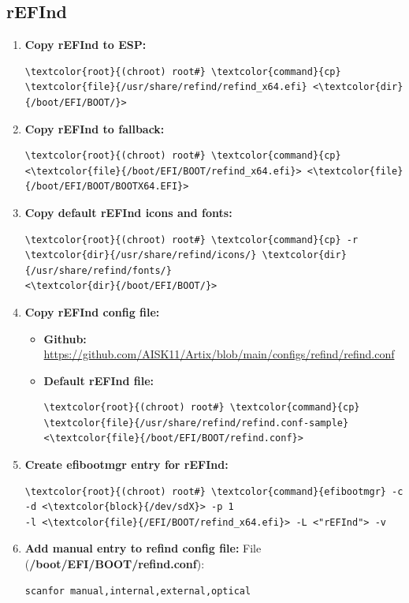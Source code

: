 \documentclass[10pt, a4paper, onecolumn, oneside, titlepage, openany]{book}
\begin{document}
\subsection{rEFInd}
\begin{enumerate}
    \item \textbf{Copy rEFInd to ESP:}
\begin{Verbatim}[commandchars=\\\{\}]
\textcolor{root}{(chroot) root#} \textcolor{command}{cp} \textcolor{file}{/usr/share/refind/refind_x64.efi} <\textcolor{dir}{/boot/EFI/BOOT/}>
\end{Verbatim}
    \item \textbf{Copy rEFInd to fallback:}
\begin{Verbatim}[commandchars=\\\{\}]
\textcolor{root}{(chroot) root#} \textcolor{command}{cp} <\textcolor{file}{/boot/EFI/BOOT/refind_x64.efi}> <\textcolor{file}{/boot/EFI/BOOT/BOOTX64.EFI}>
\end{Verbatim}
    \item \textbf{Copy default rEFInd icons and fonts:}
\begin{Verbatim}[commandchars=\\\{\}]
\textcolor{root}{(chroot) root#} \textcolor{command}{cp} -r \textcolor{dir}{/usr/share/refind/icons/} \textcolor{dir}{/usr/share/refind/fonts/}
<\textcolor{dir}{/boot/EFI/BOOT/}>
\end{Verbatim}
    \item \textbf{Copy rEFInd config file:}
    \begin{itemize}
        \item \textbf{Github:}
\newline \url{https://github.com/AISK11/Artix/blob/main/configs/refind/refind.conf}
        \item \textbf{Default rEFInd file:}
\begin{Verbatim}[commandchars=\\\{\}]
\textcolor{root}{(chroot) root#} \textcolor{command}{cp} \textcolor{file}{/usr/share/refind/refind.conf-sample}
<\textcolor{file}{/boot/EFI/BOOT/refind.conf}>
\end{Verbatim}
    \end{itemize}
    \item \textbf{Create efibootmgr entry for rEFInd:}
\begin{Verbatim}[commandchars=\\\{\}]
\textcolor{root}{(chroot) root#} \textcolor{command}{efibootmgr} -c -d <\textcolor{block}{/dev/sdX}> -p 1
-l <\textcolor{file}{/EFI/BOOT/refind_x64.efi}> -L <"rEFInd"> -v
\end{Verbatim}
    \item \textbf{Add manual entry to refind config file:}
\newline File (\textbf{\textcolor{file}{/boot/EFI/BOOT/refind.conf}}):
\begin{Verbatim}[commandchars=\\\{\}]
scanfor manual,internal,external,optical


\end{Verbatim}
\end{enumerate}
\end{document}
